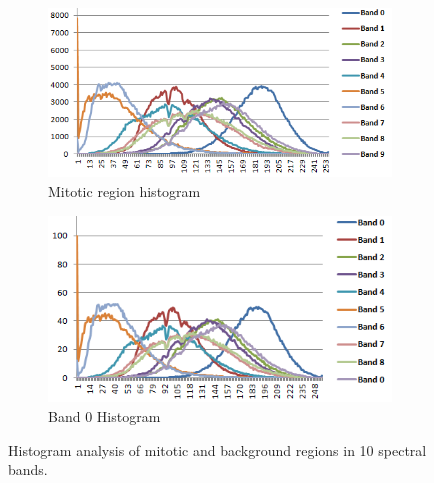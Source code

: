 \documentclass[10pt,twocolumn,letterpaper]{article}
\begin{document}
\begin{figure}[b]
	\centering
	\begin{subfigure}[b]{0.22\textwidth}
		\includegraphics[width=\textwidth]{diagrams/AllBandsHistrogramActual.png}
		\caption*{Mitotic region histogram}
	\end{subfigure}
	\begin{subfigure}[b]{0.22\textwidth}
		\includegraphics[width=\textwidth]{diagrams/AllBandsHistrogram.png}
		\caption*{Band 0 Histogram}
	\end{subfigure}
	\caption{Histogram analysis of mitotic and background regions in 10 spectral bands.}
	\label{fig:bands_histogram}	
\end{figure}
\end{document}
